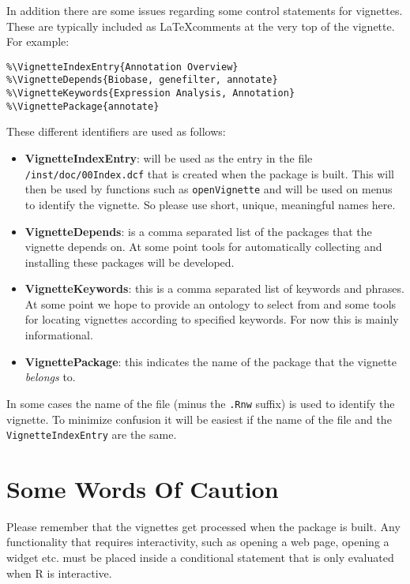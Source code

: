 \documentclass{article}
\newcommand{\Rfunction}[1]{{\texttt{#1}}}
\begin{document}
In addition there are some issues regarding some control statements
for vignettes.  These are typically included as \LaTeX comments at the
very top of the vignette.  For example:

\begin{verbatim}
%\VignetteIndexEntry{Annotation Overview}
%\VignetteDepends{Biobase, genefilter, annotate}
%\VignetteKeywords{Expression Analysis, Annotation}
%\VignettePackage{annotate}
\end{verbatim}

These different identifiers are used as follows:
\begin{itemize}
\item \textbf{VignetteIndexEntry}: will be used as the entry in the
  file \texttt{/inst/doc/00Index.dcf} that is created when the package is
  built. This will then be used by functions such as
  \Rfunction{openVignette} and will be used on menus to identify the
  vignette. So please use short, unique, meaningful names here.
\item \textbf{VignetteDepends}: is a comma separated list of the
  packages that the vignette depends on. At some point tools for
  automatically collecting and installing these packages will be
  developed. 
\item \textbf{VignetteKeywords}: this is a comma separated list of
  keywords and phrases. At some point we hope to provide an ontology
  to select from and some tools for locating vignettes according to
  specified keywords. For now this is mainly informational.
\item \textbf{VignettePackage}: this indicates the name of the package
  that the vignette \textit{belongs} to.
\end{itemize}

In some cases the name of the file (minus the \texttt{.Rnw} suffix) is
used to identify the vignette. To minimize confusion it will be
easiest if the name of the file and the \texttt{VignetteIndexEntry}
are the same.

\section*{Some Words Of Caution}

Please remember that the vignettes get processed when the package is
built. Any functionality that requires interactivity, such as opening
a web page, opening a widget etc. must be placed inside a conditional
statement that is only evaluated when R is interactive.
\end{document}
